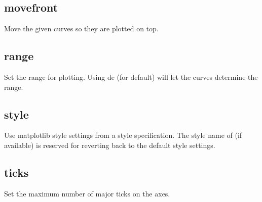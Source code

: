\documentclass[letterpaper,10pt,english]{sphinxmanual}
\begin{document}
\subsection{movefront}
\label{\detokenize{plot_control_cmds:movefront}}
Move the given curves so they are plotted on top.

\begin{sphinxVerbatim}[commandchars=\\\{\}]
\PYG{p}{[}\PYG{p}{]}  
\end{sphinxVerbatim}


\subsection{range}
\label{\detokenize{plot_control_cmds:range}}
Set the range for plotting. Using de (for default) will let the curves determine the range. 

\begin{sphinxVerbatim}[commandchars=\\\{\}]
\PYG{p}{[}\PYG{p}{]}     
\end{sphinxVerbatim}


\subsection{style}
\label{\detokenize{plot_control_cmds:style}}
Use matplotlib style settings from a style specification. The style name of  (if
available) is reserved for reverting back to the default style settings.

\begin{sphinxVerbatim}[commandchars=\\\{\}]
\PYG{p}{[}\PYG{p}{]}  
\end{sphinxVerbatim}


\subsection{ticks}
\label{\detokenize{plot_control_cmds:ticks}}
Set the maximum number of major ticks on the axes.
\end{document}
